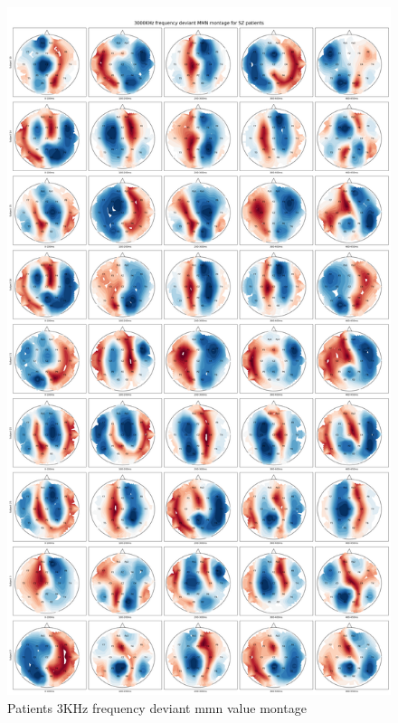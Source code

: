 \documentclass[10pt]{article}
\begin{document}
\begin{figure}[H]
  \includegraphics[width=16cm]{../../../data_analysis_results/MMN/montage/Patient/3KHz_frequency_deviant_montage.png}
  \caption{Patients 3KHz frequency deviant \gls{mmn} value montage}\label{patient_3KHz_mmn_montage}
\end{figure}
\end{document}
